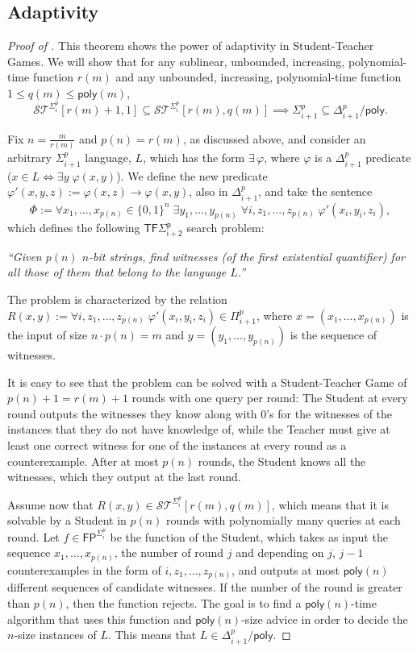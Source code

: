 \documentclass[11pt]{article}
\newcommand{\poly}{\mathsf{poly}}
\newcommand{\FP}{\mathsf{FP}}
\theoremstyle{definition}
\theoremstyle{definition}
\theoremstyle{remark}
\begin{document}
\subsection{Adaptivity}\label{sec:st1}
       \begin{proof}[Proof of ]
        This theorem shows the power of adaptivity in Student-Teacher Games. We will show that for any sublinear, unbounded, increasing, polynomial-time function $r(m)$ and any unbounded, increasing, polynomial-time function $1\leq q(m)\leq \poly(m)$,
        $$
        \mathcal{ST}^{\Sigma^p_i}[r(m)+1,1]\subseteq \mathcal{ST}^{\Sigma^p_i}[r(m),q(m)] \implies \Sigma^p_{i+1}\subseteq \Delta^p_{i+1}/\poly.
        $$
        
        Fix $n=\frac{m}{r(m)}$ and $p(n)=r(m)$, as discussed above, and consider an arbitrary $\Sigma^p_{i+1}$ language, $L$, which has the form $\exists \,\varphi $, where $\varphi$ is a $\Delta^p_{i+1}$ predicate ($x\in L\iff \exists y\;\varphi(x,y)$). We define the new predicate $\varphi'(x,y,z):= \varphi(x,z)\rightarrow \varphi(x,y)$, also in $\Delta^p_{i+1}$, and take the sentence
    \begin{equation}
        \Phi:=\forall x_1,\dots,x_{p(n)}\in \{0,1\}^n\; \exists y_1,\dots,y_{p(n)} \;\forall i,z_1,\dots,z_{p(n)}\; \varphi'(x_i,y_i,z_i),
        \nonumber
    \end{equation}
    which defines the following $\mathsf{TF\Sigma^p_{i+2}}$ search problem:

    \emph{``Given $p(n)$ $n$-bit strings, find witnesses (of the first existential quantifier) for all those of them that belong to the language $L$.''}
   
    The problem is characterized by the relation $R(x,y):=\forall i,z_1,\dots,z_{p(n)}\; \varphi'(x_i,y_i,z_i)\in \Pi^p_{i+1}$, where $x=(x_1,\dots,x_{p(n)})$ is the input of size $n\cdot p(n)=m$ and $y=(y_1,\dots,y_{p(n)})$ is the sequence of witnesses.
    
    It is easy to see that the problem can be solved with a Student-Teacher Game of $p(n)+1=r(m)+1$ rounds with one query per round: The Student at every round outputs the witnesses they know along with $0$'s for the witnesses of the instances that they do not have knowledge of, while the Teacher must give at least one correct witness for one of the instances at every round as a counterexample. After at most $p(n)$ rounds, the Student knows all the witnesses, which they output at the last round.

    Assume now that $R(x,y)\in \mathcal{ST}^{\Sigma^p_i}[r(m),q(m)]$, which means that it is solvable by a Student in $p(n)$ rounds with polynomially many queries at each round. Let $f\in \FP^{\Sigma^p_i}$ be the function of the Student, which takes as input the sequence $x_1,\dots,x_{p(n)}$, the number of round $j$ and depending on $j$, $j-1$ counterexamples in the form of $i,z_1,\dots,z_{p(n)}$, and outputs at most $\poly(n)$ different sequences of candidate witnesses. If the number of the round is greater than $p(n)$, then the function rejects. The goal is to find a $\poly(n)$-time algorithm that uses this function and $\poly(n)$-size advice in order to decide the $n$-size instances of $L$. This means that $L\in \Delta^p_{i+1}/\poly$.


\end{proof}
\end{document}
